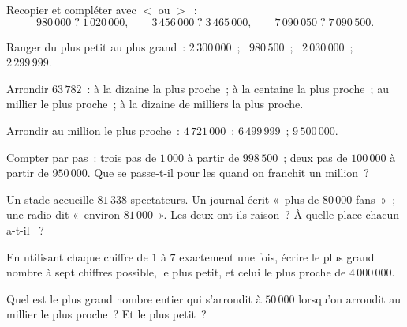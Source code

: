 \begin{exercise}[$\star$]\label{exo:g4:numbers:4}
Recopier et compléter avec $<$ ou $>$~:
\[
980\,000 \;?\; 1\,020\,000, \qquad
3\,456\,000 \;?\; 3\,465\,000, \qquad
7\,090\,050 \;?\; 7\,090\,500 .
\]
\end{exercise}

\begin{exercise}[$\star$]\label{exo:g4:numbers:5}
Ranger du plus petit au plus grand~: $2\,300\,000$~; \ $980\,500$~; \
$2\,030\,000$~; \ $2\,299\,999$.
\end{exercise}

\begin{exercise}[$\star$]\label{exo:g4:numbers:6}
Arrondir $63\,782$~: à la dizaine la plus proche~; à la centaine la
plus proche~; au millier le plus proche~; à la dizaine de milliers
la plus proche.
\end{exercise}

\begin{exercise}[$\star$]\label{exo:g4:numbers:7}
Arrondir au million le plus proche~: $4\,721\,000$~; \quad
$6\,499\,999$~; \quad $9\,500\,000$.
\end{exercise}

\begin{exercise}[$\star$]\label{exo:g4:numbers:8}
Compter par pas~: trois pas de $1\,000$ à partir de $998\,500$~;
deux pas de $100\,000$ à partir de $950\,000$. Que se passe-t-il
pour les \omterm{def:g4:numbers:classes}{classes} quand on franchit un million~?
\end{exercise}

\begin{exercise}[$\star$]\label{exo:g4:numbers:9}
Un stade accueille $81\,338$ spectateurs. Un journal écrit «~plus de
$80\,000$ fans~»~; une radio dit «~environ $81\,000$~». Les deux ont-ils
raison~? À quelle place chacun a-t-il ~?
\end{exercise}

\begin{exercise}[$\star\star$]\label{exo:g4:numbers:10}
En utilisant chaque chiffre de $1$ à $7$ exactement une fois, écrire
le plus grand nombre à sept chiffres possible, le plus petit, et
celui le plus proche de $4\,000\,000$.
\end{exercise}

\begin{exercise}[$\star\star$]\label{exo:g4:numbers:11}
Quel est le plus grand nombre entier qui s'arrondit à $50\,000$
lorsqu'on arrondit au millier le plus proche~? Et le plus petit~?
\end{exercise}
